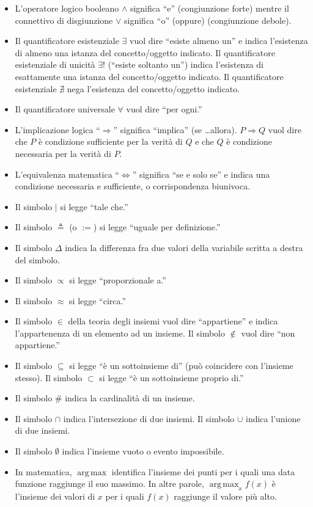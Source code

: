 \documentclass[
]{memoir}
\DeclareMathOperator*{\argmax}{arg\,max} %
\theoremstyle{definition}
\theoremstyle{definition}
\theoremstyle{definition}
\theoremstyle{definition}
\theoremstyle{remark}
\begin{document}
\begin{itemize}
\item
  L'operatore logico booleano \(\land\) significa ``e'' (congiunzione
  forte) mentre il connettivo di disgiunzione \(\lor\) significa ``o''
  (oppure) (congiunzione debole).
\item
  Il quantificatore esistenziale \(\exists\) vuol dire ``esiste almeno
  un'' e indica l'esistenza di almeno una istanza del concetto/oggetto
  indicato. Il quantificatore esistenziale di unicità \(\exists!\)
  (``esiste soltanto un'') indica l'esistenza di esattamente una istanza
  del concetto/oggetto indicato. Il quantificatore esistenziale
  \(\nexists\) nega l'esistenza del concetto/oggetto indicato.
\item
  Il quantificatore universale \(\forall\) vuol dire ``per ogni.''
\item
  L'implicazione logica ``\(\Rightarrow\)'' significa ``implica'' (se
  \ldots allora). \(P \Rightarrow Q\) vuol dire che \(P\) è condizione
  sufficiente per la verità di \(Q\) e che \(Q\) è condizione necessaria
  per la verità di \(P\).
\item
  L'equivalenza matematica ``\(\iff\)'' significa ``se e solo se'' e indica
  una condizione necessaria e sufficiente, o corrispondenza biunivoca.
\item
  Il simbolo \(\vert\) si legge ``tale che.''
\item
  Il simbolo \(\triangleq\) (o \(:=\)) si legge ``uguale per definizione.''
\item
  Il simbolo \(\Delta\) indica la differenza fra due valori della
  variabile scritta a destra del simbolo.
\item
  Il simbolo \(\propto\) si legge ``proporzionale a.''
\item
  Il simbolo \(\approx\) si legge ``circa.''
\item
  Il simbolo \(\in\) della teoria degli insiemi vuol dire ``appartiene'' e
  indica l'appartenenza di un elemento ad un insieme. Il simbolo
  \(\notin\) vuol dire ``non appartiene.''
\item
  Il simbolo \(\subseteq\) si legge ``è un sottoinsieme di'' (può
  coincidere con l'insieme stesso). Il simbolo \(\subset\) si legge ``è
  un sottoinsieme proprio di.''
\item
  Il simbolo \(\#\) indica la cardinalità di un insieme.
\item
  Il simbolo \(\cap\) indica l'intersezione di due insiemi. Il simbolo
  \(\cup\) indica l'unione di due insiemi.
\item
  Il simbolo \(\emptyset\) indica l'insieme vuoto o evento impossibile.
\item
  In matematica, \(\argmax\) identifica l'insieme dei punti per i quali una data funzione raggiunge il suo massimo. In altre parole, \(\argmax_x f(x)\) è l'insieme dei valori di \(x\) per i quali \(f(x)\) raggiunge il valore più alto.
\end{itemize}
\end{document}
